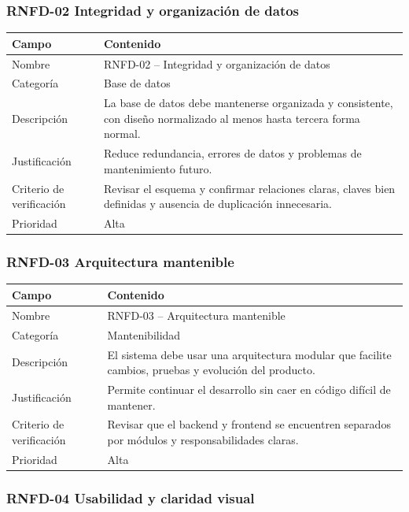 \documentclass[12pt]{article}
\begin{document}
\subsubsection{RNFD-02 Integridad y organizaci\'on de datos}

\begin{tabularx}{\textwidth}{|P{3.3cm}|Y|}
\hline
{}
\textbf{Campo} & \textbf{Contenido} \\
\hline
Nombre & RNFD-02 -- Integridad y organizaci\'on de datos \\
\hline
Categor\'ia & Base de datos \\
\hline
Descripci\'on & La base de datos debe mantenerse organizada y consistente, con dise\~no normalizado al menos hasta tercera forma normal. \\
\hline
Justificaci\'on & Reduce redundancia, errores de datos y problemas de mantenimiento futuro. \\
\hline
Criterio de verificaci\'on & Revisar el esquema y confirmar relaciones claras, claves bien definidas y ausencia de duplicaci\'on innecesaria. \\
\hline
Prioridad & Alta \\
\hline
\end{tabularx}

\subsubsection{RNFD-03 Arquitectura mantenible}

\begin{tabularx}{\textwidth}{|P{3.3cm}|Y|}
\hline
{}
\textbf{Campo} & \textbf{Contenido} \\
\hline
Nombre & RNFD-03 -- Arquitectura mantenible \\
\hline
Categor\'ia & Mantenibilidad \\
\hline
Descripci\'on & El sistema debe usar una arquitectura modular que facilite cambios, pruebas y evoluci\'on del producto. \\
\hline
Justificaci\'on & Permite continuar el desarrollo sin caer en c\'odigo dif\'icil de mantener. \\
\hline
Criterio de verificaci\'on & Revisar que el backend y frontend se encuentren separados por m\'odulos y responsabilidades claras. \\
\hline
Prioridad & Alta \\
\hline
\end{tabularx}

\subsubsection{RNFD-04 Usabilidad y claridad visual}
\end{document}
